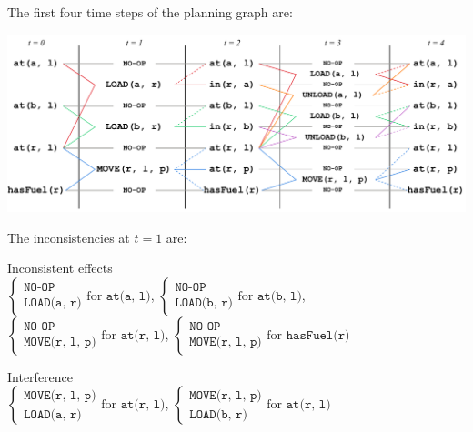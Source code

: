 \begin{example}
    The first four time steps of the planning graph are:
    \begin{center}
        \includegraphics[width=\textwidth]{img/_graphplan.pdf}
    \end{center}

    The inconsistencies at $t=1$ are:
    \begin{descriptionlist}
        \item[Inconsistent effects] \phantom{}\\[0.5em]
            $\begin{cases}\texttt{NO-OP} \\ \texttt{LOAD(a, r)}\end{cases} \text{for } \texttt{at(a, l)}$,
            $\begin{cases}\texttt{NO-OP} \\ \texttt{LOAD(b, r)}\end{cases} \text{for } \texttt{at(b, l)}$,\\[0.3em]
            $\begin{cases}\texttt{NO-OP} \\ \texttt{MOVE(r, l, p)}\end{cases} \text{for } \texttt{at(r, l)}$,
            $\begin{cases}\texttt{NO-OP} \\ \texttt{MOVE(r, l, p)}\end{cases} \text{for } \texttt{hasFuel(r)}$

        \item[Interference] \phantom{}\\[0.5em]
            $\begin{cases}\texttt{MOVE(r, l, p)} \\ \texttt{LOAD(a, r)}\end{cases} \text{for } \texttt{at(r, l)}$,
            $\begin{cases}\texttt{MOVE(r, l, p)} \\ \texttt{LOAD(b, r)}\end{cases} \text{for } \texttt{at(r, l)}$
    \end{descriptionlist}


\end{example}
